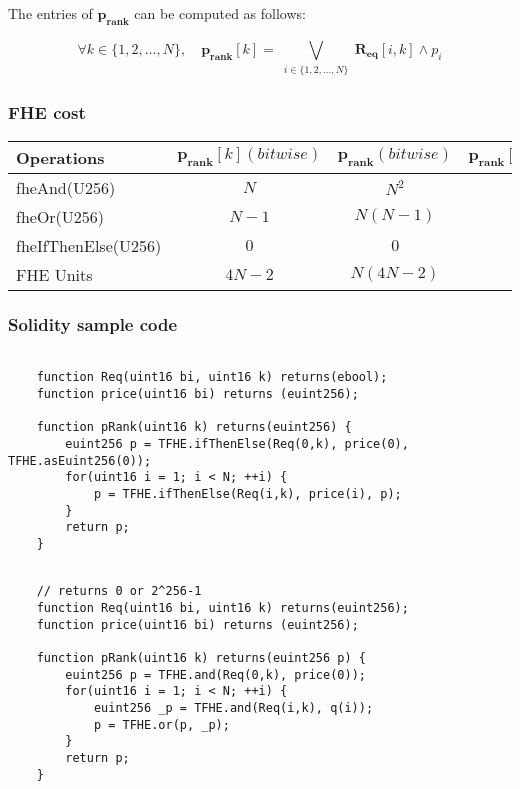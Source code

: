 The entries of $\mathbf{p_{rank}}$ can be computed as follows:

\begin{equation*}
    \forall k \in \{1, 2, \dots, N\}, \quad \mathbf{p_{rank}}[k] = \bigvee_{\substack{i \in \{1, 2, \dots, N\}}} \mathbf{R_{eq}}[i, k] \land p_i
\end{equation*}

\subsubsection{FHE cost}

\renewcommand{\arraystretch}{1.5}
\begin{tabular}{ |l|c|c|c|c| }
    \hline    
    Operations & $\mathbf{p_{rank}}[k] (bitwise)$ & $\mathbf{p_{rank}} (bitwise)$ & $\mathbf{p_{rank}}[k] (if/then/else)$ & $\mathbf{p_{rank}} (if/then/else)$ \\ 
    \hline
    fheAnd(U256) & $N$ & $N^2$ & $0$ & $0$ \\
    fheOr(U256) & $N-1$ & $N(N-1)$ & $0$ & $0$ \\
    fheIfThenElse(U256) & $0$ & $0$ & $N$ & $N^2$ \\
    \hline
    \hline
    FHE Units & $4N-2$ & $N(4N-2)$ & $4N$ & $4N^2$ \\
    \hline
\end{tabular}

\subsubsection{Solidity sample code}

\begin{lstlisting}[language=Solidity]

    function Req(uint16 bi, uint16 k) returns(ebool);
    function price(uint16 bi) returns (euint256);

    function pRank(uint16 k) returns(euint256) {
        euint256 p = TFHE.ifThenElse(Req(0,k), price(0), TFHE.asEuint256(0));
        for(uint16 i = 1; i < N; ++i) {
            p = TFHE.ifThenElse(Req(i,k), price(i), p);
        }
        return p;
    }
\end{lstlisting}

\begin{lstlisting}[language=Solidity]

    // returns 0 or 2^256-1
    function Req(uint16 bi, uint16 k) returns(euint256);
    function price(uint16 bi) returns (euint256);

    function pRank(uint16 k) returns(euint256 p) {
        euint256 p = TFHE.and(Req(0,k), price(0));
        for(uint16 i = 1; i < N; ++i) {
            euint256 _p = TFHE.and(Req(i,k), q(i));
            p = TFHE.or(p, _p);
        }
        return p;
    }    

\end{lstlisting}
